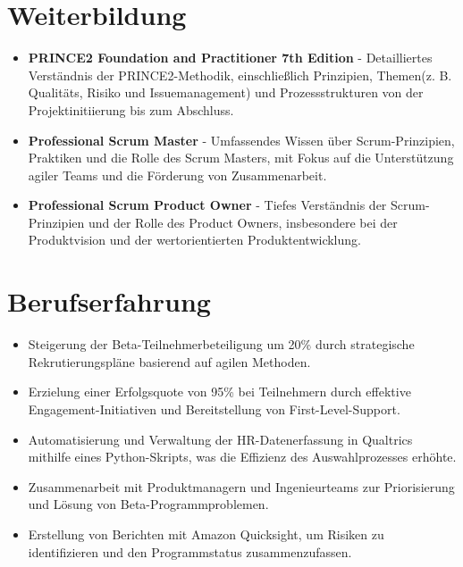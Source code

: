 \documentclass[10pt,a4paper,sans]{moderncv}        %
\title{\normalfont{\textbf{\small{\color{black}Erfahrener Programmmanager | Agile-Spezialist | Master in Informationstechnologie}}}}
\begin{document}
\setlength{\quotewidth}{2.85\textwidth}
\makecvtitle
\section{Weiterbildung}
 {}
\cvitem{} {
	\begin{itemize}
		\item{{\textbf{PRINCE2 Foundation and Practitioner 7th Edition} - Detailliertes Verständnis der PRINCE2-Methodik, einschließlich Prinzipien, Themen(z. B. Qualitäts, Risiko und Issuemanagement) und Prozessstrukturen von der Projektinitiierung bis zum Abschluss.}} 
		\item{{\textbf{Professional Scrum Master} - Umfassendes Wissen über Scrum-Prinzipien, Praktiken und die Rolle des Scrum Masters, mit Fokus auf die Unterstützung agiler Teams und die Förderung von Zusammenarbeit.}}							
		\item{{\textbf{Professional Scrum Product Owner} - Tiefes Verständnis der Scrum-Prinzipien und der Rolle des Product Owners, insbesondere bei der Produktvision und der wertorientierten Produktentwicklung.}}
	\end{itemize}
}

\section{Berufserfahrung}
 {}
 {
	\begin{itemize}
		\item Steigerung der Beta-Teilnehmerbeteiligung um 20\% durch strategische Rekrutierungspläne basierend auf agilen Methoden.
		\item Erzielung einer Erfolgsquote von 95\% bei Teilnehmern durch effektive Engagement-Initiativen und Bereitstellung von First-Level-Support.
		\item Automatisierung und Verwaltung der HR-Datenerfassung in Qualtrics mithilfe eines Python-Skripts, was die Effizienz des Auswahlprozesses erhöhte.
		\item Zusammenarbeit mit Produktmanagern und Ingenieurteams zur Priorisierung und Lösung von Beta-Programmproblemen.
		\item Erstellung von Berichten mit Amazon Quicksight, um Risiken zu identifizieren und den Programmstatus zusammenzufassen.		
	\end{itemize}
}
\end{document}
